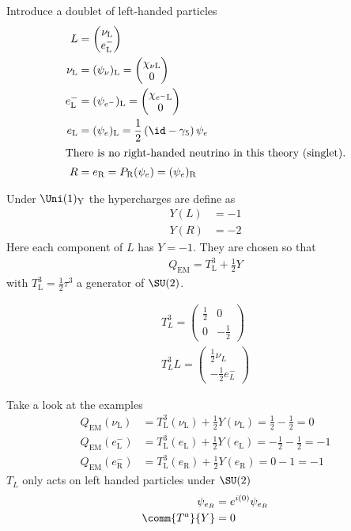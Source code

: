 Introduce a doublet of left-handed particles
\begin{align*}
   L &= \begin{pmatrix} \nu_\text{L} \\ e^-_\text{L} \end{pmatrix} \\
   \nu_\text{L} &= (\psi_\nu)_\text{L} =  \begin{pmatrix} \chi_{\nu \text{L}} \\ 0 \end{pmatrix}    \\
   e_\text{L}^- &= (\psi_{e^-})_\text{L} = \begin{pmatrix} \chi_{e^- \text{L}} \\ 0 \end{pmatrix} \\
   e_\text{L} &= (\psi_e)_\text{L} = \frac{1}{2} \left( \id - \gamma_5 \right) \psi_e \\
   \shortintertext{There is no right-handed neutrino in this theory (singlet).}
   R &= e_\text{R} = P_\text{R} (\psi_e) = (\psi_e)_\text{R}
\end{align*}

Under $\Uni(1)_\text{Y}$ the hypercharges are define as
\begin{align}
   {Y}(L) &= -1 \\
   {Y}(R) &= -2
\end{align}
Here each component of $L$ has $Y=-1$. They are chosen so that 
\begin{align*}
   Q_{\text{EM}} = T^3_\text{L} + \frac{1}{2} Y
\end{align*}
with $T^3_\text{L} = \frac{1}{2} \tau^3$ a generator of $\SU(2)$.

\begin{align*}
   T^3_L = \begin{pmatrix} \frac{1}{2} & 0 \\ 0 & -\frac{1}{2} \end{pmatrix} \\
   T^3_L L  = \begin{pmatrix} \frac{1}{2} \nu_L \\ -\frac{1}{2} e^-_L\end{pmatrix}
\end{align*}

Take a look at the examples
\begin{align*}
   Q_{\text{EM}}(\nu_\text{L}) &= T^3_\text{L}(\nu_\text{L}) + \frac{1}{2} Y(\nu_\text{L}) = \frac{1}{2} - \frac{1}{2} = 0 \\
   Q_{\text{EM}}(e^-_\text{L}) &= T^3_\text{L}(e_\text{L}) + \frac{1}{2} Y(e_\text{L}) = -\frac{1}{2} - \frac{1}{2} = -1 \\
   Q_{\text{EM}}(e^-_\text{R}) &= T^3_\text{L}(e_\text{R}) + \frac{1}{2} Y(e_\text{R}) = 0 - 1 = -1
\end{align*}
$T_L$ only acts on left handed particles under $\SU(2)$
\begin{align*}
   \psi_{e_R} &= e^{i(0)} \psi_{e_R}  \\
   \comm{T^a}{Y} &= 0
\end{align*}


